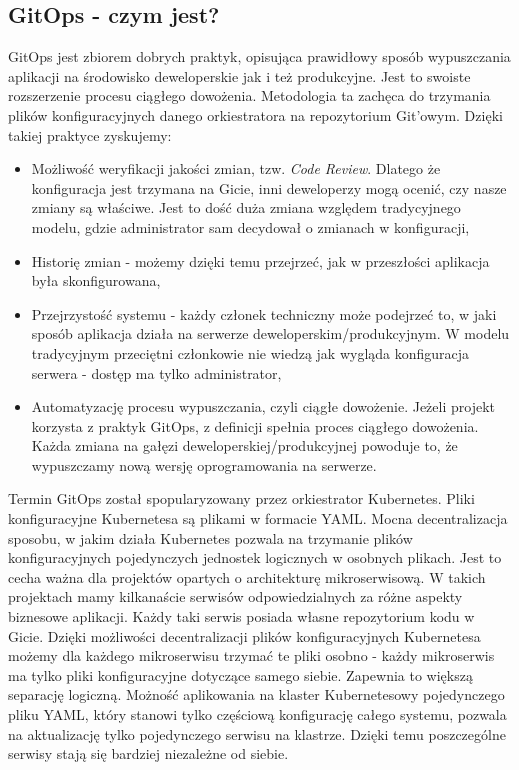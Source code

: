 \subsection{GitOps - czym jest?}
GitOps jest zbiorem dobrych praktyk, opisująca prawidłowy sposób wypuszczania aplikacji na środowisko deweloperskie jak i też produkcyjne. Jest to swoiste rozszerzenie procesu ciągłego dowożenia. Metodologia ta zachęca do trzymania plików konfiguracyjnych danego orkiestratora na repozytorium Git'owym. Dzięki takiej praktyce zyskujemy:
\begin{itemize}
    \item Możliwość weryfikacji jakości zmian, tzw. \textit{Code Review}. Dlatego że konfiguracja jest trzymana na Gicie, inni deweloperzy mogą ocenić, czy nasze zmiany są właściwe. Jest to dość duża zmiana względem tradycyjnego modelu, gdzie administrator sam decydował o zmianach w konfiguracji,
    \item Historię zmian - możemy dzięki temu przejrzeć, jak w przeszłości aplikacja była skonfigurowana,
    \item Przejrzystość systemu - każdy członek techniczny może podejrzeć to, w jaki sposób aplikacja działa na serwerze deweloperskim/produkcyjnym. W modelu tradycyjnym przeciętni członkowie nie wiedzą jak wygląda konfiguracja serwera - dostęp ma tylko administrator,
    \item Automatyzację procesu wypuszczania, czyli ciągłe dowożenie. Jeżeli projekt korzysta z praktyk GitOps, z definicji spełnia proces ciągłego dowożenia. Każda zmiana na gałęzi deweloperskiej/produkcyjnej powoduje to, że wypuszczamy nową wersję oprogramowania na serwerze.
\end{itemize}
\par
Termin GitOps został spopularyzowany przez orkiestrator Kubernetes. Pliki konfiguracyjne Kubernetesa są plikami w formacie YAML. Mocna decentralizacja sposobu, w jakim działa Kubernetes pozwala na trzymanie plików konfiguracyjnych pojedynczych jednostek logicznych w osobnych plikach. Jest to cecha ważna dla projektów opartych o architekturę mikroserwisową. W takich projektach mamy kilkanaście serwisów odpowiedzialnych za różne aspekty biznesowe aplikacji. Każdy taki serwis posiada własne repozytorium kodu w Gicie. Dzięki możliwości decentralizacji plików konfiguracyjnych Kubernetesa możemy dla każdego mikroserwisu trzymać te pliki osobno - każdy mikroserwis ma tylko pliki konfiguracyjne dotyczące samego siebie. Zapewnia to większą separację logiczną. Możność aplikowania na klaster Kubernetesowy pojedynczego pliku YAML, który stanowi tylko częściową konfigurację całego systemu, pozwala na aktualizację tylko pojedynczego serwisu na klastrze. Dzięki temu poszczególne serwisy stają się bardziej niezależne od siebie.
